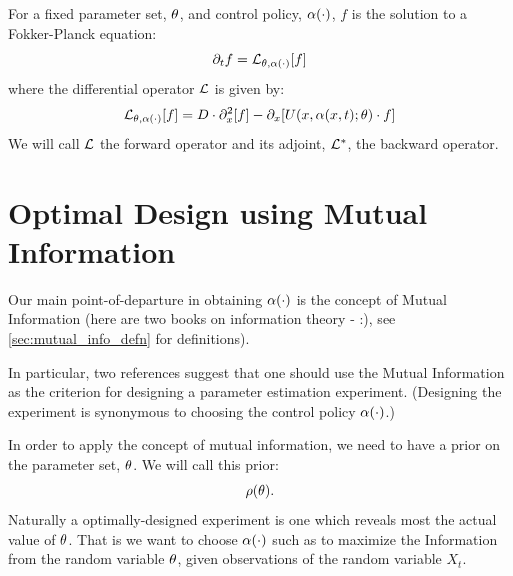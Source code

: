 For a fixed parameter set, ${ \theta}$, and control policy, $\alpha(\cdot)$, $f$ is the
solution to a Fokker-Planck equation:
\begin{equation}
{\partial}_t f = { \mathcal{L} }_{{ \theta}, \alpha(\cdot)}[f]
\label{eq:fokker_planck_forward_density}
\end{equation}
where the differential operator ${ \mathcal{L} }$ is given by:
$$
{ \mathcal{L} }_{{ \theta}, \alpha(\cdot)}[f] = D \cdot {\partial}_x^2 [f] - {\partial}_x[U(x,\alpha(x,t); { \theta}) \cdot f]
$$
We will call ${ \mathcal{L} }$ the forward operator and its adjoint, ${ { \mathcal{L} }^* }$, the backward
operator.


\section{Optimal Design using Mutual Information}
Our main point-of-departure in obtaining $\alpha(\cdot)$ is the concept of Mutual
Information (here are two books on information theory -
\cite{Cover2006,MacKay2003} :), see \cref{sec:mutual_info_defn} for
definitions).

In particular, two references suggest that one should use the Mutual
Information \cite{Myung2013,Lewi2009} as the criterion for designing a parameter
estimation experiment. (Designing the experiment is synonymous to
choosing the control policy $\alpha(\cdot)$.)

In order to apply the concept of mutual information, we need to have a prior on
the parameter set, ${ \theta}$. We will call this prior: 
$$\rho({ \theta}).$$ 
Naturally a optimally-designed experiment is one which reveals most the actual
value of ${ \theta}$. That is we want to choose $\alpha(\cdot)$ such as to maximize the
Information from the random variable ${ \theta}$, given observations of the random
variable $X_t$.

